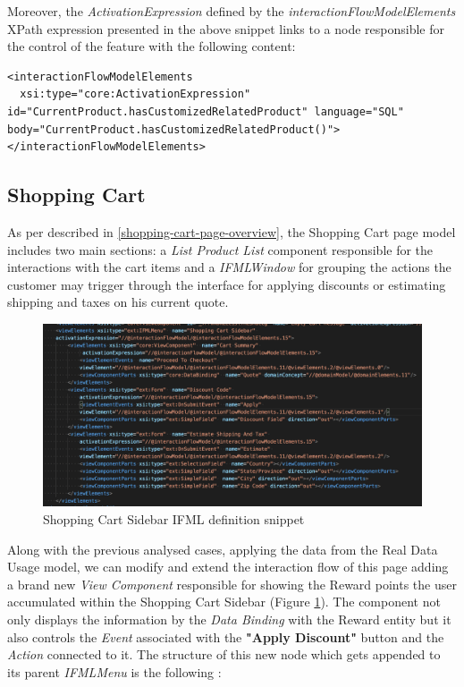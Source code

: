 Moreover, the \textit{ActivationExpression} defined by the \textit{interactionFlowModelElements} XPath expression presented in the above snippet  links to a node responsible for the control of the feature with the following content:

\vspace{0.5cm}
\lstset{language=XML}
\begin{lstlisting} 
<interactionFlowModelElements 
  xsi:type="core:ActivationExpression" id="CurrentProduct.hasCustomizedRelatedProduct" language="SQL" body="CurrentProduct.hasCustomizedRelatedProduct()">
</interactionFlowModelElements>

\end{lstlisting}
\vspace{0.5cm}
\subsection{Shopping Cart}

As per described in \ref{shopping-cart-page-overview}, the Shopping Cart page model includes two main sections: a \textit{List Product List} component responsible for the interactions with the cart items and a \textit{IFMLWindow} for grouping the actions the customer may trigger through the interface for applying discounts or estimating shipping and taxes on his current quote.

\vspace{0.5cm}
\begin{figure}[H]
  \centering
    \includegraphics[width=12cm]{images/madison/ifml-shopping-cart-sidebar.png}
  \caption{Shopping Cart Sidebar IFML definition snippet}
  \label{fig:shopping-cart-sidebar-ifml-definition}
\end{figure}
\vspace{0.5cm}

Along with the previous analysed cases, applying the data from the Real Data Usage model, we can modify and extend the interaction flow of this page adding a brand new \textit{View Component} responsible for showing the Reward points the user accumulated within the Shopping Cart Sidebar (Figure \ref{fig:shopping-cart-sidebar-ifml-definition}). The component not only displays the information by the  \textit{Data Binding} with the Reward entity but it also controls the \textit{Event} associated with the \textbf{"Apply Discount"} button and the \textit{Action} connected to it. 
The structure of this new node which gets appended to its parent \textit{IFMLMenu} is the following :


